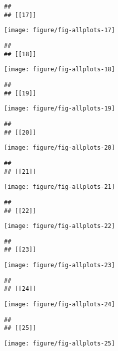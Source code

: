 \documentclass[a4]{article}\usepackage[]{graphicx}\usepackage[]{color}
\makeatletter
\def\maxwidth{ %
  \ifdim\Gin@nat@width>\linewidth
    \linewidth
  \else
    \Gin@nat@width
  \fi
}
\newenvironment{kframe}{%
 \def\at@end@of@kframe{}%
 \ifinner\ifhmode%
  \def\at@end@of@kframe{\end{minipage}}%
  \begin{minipage}{\columnwidth}%
 \fi\fi%
 \def\FrameCommand##1{\hskip\@totalleftmargin \hskip-\fboxsep
 \colorbox{shadecolor}{##1}\hskip-\fboxsep
     \hskip-\linewidth \hskip-\@totalleftmargin \hskip\columnwidth}%
 \MakeFramed {\advance\hsize-\width
   \@totalleftmargin\z@ \linewidth\hsize
   \@setminipage}}%
 {\par\unskip\endMakeFramed%
 \at@end@of@kframe}
\newenvironment{knitrout}{}{} %
\makeatother
\begin{document}
\begin{knitrout}
\begin{kframe}
\begin{verbatim}
## 
## [[17]]
\end{verbatim}
\end{kframe}
\texttt{[image: figure/fig-allplots-17]} 
\begin{kframe}\begin{verbatim}
## 
## [[18]]
\end{verbatim}
\end{kframe}
\texttt{[image: figure/fig-allplots-18]} 
\begin{kframe}\begin{verbatim}
## 
## [[19]]
\end{verbatim}
\end{kframe}
\texttt{[image: figure/fig-allplots-19]} 
\begin{kframe}\begin{verbatim}
## 
## [[20]]
\end{verbatim}
\end{kframe}
\texttt{[image: figure/fig-allplots-20]} 
\begin{kframe}\begin{verbatim}
## 
## [[21]]
\end{verbatim}
\end{kframe}
\texttt{[image: figure/fig-allplots-21]} 
\begin{kframe}\begin{verbatim}
## 
## [[22]]
\end{verbatim}
\end{kframe}
\texttt{[image: figure/fig-allplots-22]} 
\begin{kframe}\begin{verbatim}
## 
## [[23]]
\end{verbatim}
\end{kframe}
\texttt{[image: figure/fig-allplots-23]} 
\begin{kframe}\begin{verbatim}
## 
## [[24]]
\end{verbatim}
\end{kframe}
\texttt{[image: figure/fig-allplots-24]} 
\begin{kframe}\begin{verbatim}
## 
## [[25]]
\end{verbatim}
\end{kframe}
\texttt{[image: figure/fig-allplots-25]} 
\begin{kframe}\begin{verbatim}

\end{verbatim}
\end{kframe}
\end{knitrout}
\end{document}
